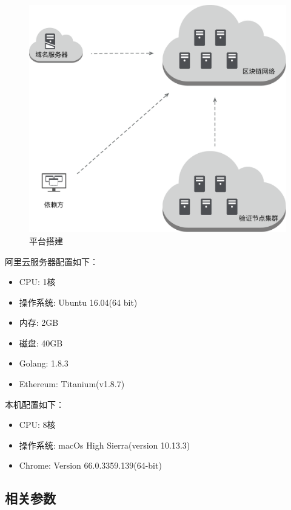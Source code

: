 \begin{figure}[!htbp]
 	\centering
 	\includegraphics[scale = 0.4]{img/platform}
 	\caption{平台搭建}\label{fig:platform}
\end{figure}

阿里云服务器配置如下：

\begin{itemize}
	\item CPU: 1核
	\item 操作系统: Ubuntu 16.04(64 bit)
	\item 内存: 2GB
	\item 磁盘: 40GB
	\item Golang: 1.8.3
	\item Ethereum: Titanium(v1.8.7)
\end{itemize}

本机配置如下：
\begin{itemize}
	\item CPU: 8核
	\item 操作系统: macOs High Sierra(version 10.13.3)
	\item Chrome: Version 66.0.3359.139(64-bit)
\end{itemize}


\subsection{相关参数}\label{pa}

